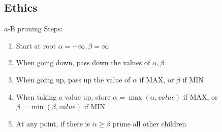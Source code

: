 \documentclass[12pt, a4paper]{article}
\begin{document}
\begin{multicols*}{3}
\section{Ethics}
\colbreak
{}

a-B pruning Steps:
\begin{enumerate}[\roman*.]
  \item Start at root $\alpha = -\infty, \beta = \infty$
  \item When going down, pass down the values of $\alpha, \beta$
  \item When going up, pass up the value of $\alpha$ if MAX, or $\beta$ if MIN
  \item When taking a value up, store $ \alpha = \max(\alpha, value)$ if MAX, or $\beta = \min(\beta, value)$ if MIN
  \item At any point, if there is $\alpha \geq \beta$ prune all other children
\end{enumerate}

\end{multicols*}
\end{document}

